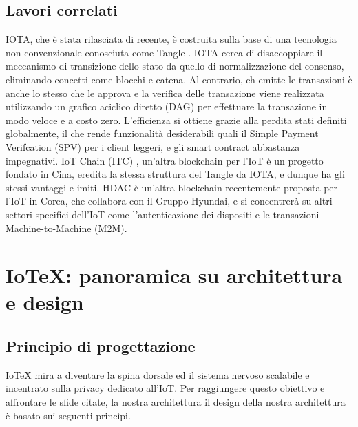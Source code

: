 \documentclass[a4paper,12pt]{article}
\begin{document}
\subsection{Lavori correlati}
IOTA, che è stata rilasciata di recente, è costruita sulla base di una tecnologia non convenzionale conosciuta come Tangle \cite{c24}. IOTA cerca di disaccoppiare il meccanismo di transizione dello stato da quello di normalizzazione del consenso, eliminando concetti come blocchi e catena. Al contrario, ch emitte le transazioni è anche lo stesso che le approva e la verifica delle transazione viene realizzata utilizzando un grafico aciclico diretto (DAG) per effettuare la transazione in modo veloce e a costo zero. L'efficienza si ottiene grazie alla perdita stati definiti globalmente, il che rende funzionalità desiderabili quali il Simple Payment Verifcation (SPV) per i client leggeri, e gli smart contract abbastanza impegnativi. IoT Chain (ITC) \cite{c16}, un'altra blockchain per l'IoT è un progetto fondato in Cina, eredita la stessa struttura del Tangle da IOTA, e dunque ha gli stessi vantaggi e imiti. HDAC \cite{c13} è un'altra blockchain recentemente proposta per l'IoT in Corea, che collabora con il Gruppo Hyundai, e si concentrerà su altri settori specifici dell'IoT come l'autenticazione dei dispositi e le transazioni Machine-to-Machine (M2M).


\section{IoTeX: panoramica su architettura e design}

\subsection{Principio di progettazione}
IoTeX mira a diventare la spina dorsale ed il sistema nervoso scalabile e incentrato sulla privacy dedicato all'IoT. Per raggiungere questo obiettivo e affrontare le sfide citate, la nostra architettura il design della nostra architettura è basato sui seguenti princìpi.
\end{document}
